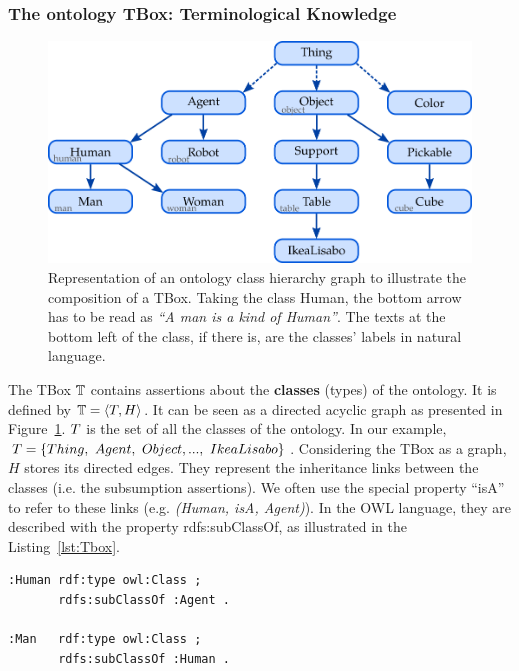 \subsubsection{The ontology TBox: Terminological Knowledge}

\begin{figure}[ht!]
\centering
\includegraphics[scale=0.4]{figures/chapter2/Tbox.png}
\caption{\label{fig:Tbox} Representation of an ontology class hierarchy graph to illustrate the composition of a TBox. Taking the class Human, the bottom arrow has to be read as \textit{``A man is a kind of Human''}. The texts at the bottom left of the class, if there is, are the classes' labels in natural language.}
\end{figure}

The TBox $\mathbb{T}$ contains assertions about the \textbf{classes} (types) of the ontology. It is defined by $\mathbb{T} = \langle T, H \rangle$. It can be seen as a directed acyclic graph as presented in Figure~\ref{fig:Tbox}. $T$ is the set of all the classes of the ontology. In our example, $T = \{Thing,\ Agent,\ Object, ...,\ IkeaLisabo\}$. Considering the TBox as a graph, $H$ stores its directed edges. They represent the inheritance links between the classes (i.e. the subsumption assertions). We often use the special property ``isA'' to refer to these links (e.g. \textit{(Human, isA, Agent)}). In the OWL language, they are described with the property rdfs:subClassOf, as illustrated in the Listing~\ref{lst:Tbox}.

\noindent
\begin{minipage}{\textwidth}
\begin{lstlisting}[frame=single, basicstyle=\scriptsize\ttfamily, label={lst:Tbox}, caption={Description of ontology classes in the OWL language using the Turle syntax.},captionpos=b, style=OwlTurtle]
:Human rdf:type owl:Class ;
       rdfs:subClassOf :Agent .

:Man   rdf:type owl:Class ;
       rdfs:subClassOf :Human .
\end{lstlisting}
\end{minipage}

